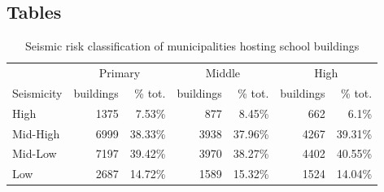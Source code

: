 \documentclass[openany, 11pt, oneside]{book}
\begin{document}
\begin{subappendices} 

 

\section{Tables} \label{Appendix1}
\begin{table}[ht]
\centering

\begin{tabular}{lrrrrrr}
  \hline
   & \multicolumn{2}{c}{Primary}& \multicolumn{2}{c}{Middle}& \multicolumn{2}{c}{High}\\
  Seismicity & buildings & \% tot. & buildings & \% tot. & buildings & \% tot. \\ 
  \hline
  High     & 1375 & 7.53\%  & 877  & 8.45\%  & 662  & 6.1\% \\ 
  Mid-High & 6999 & 38.33\% & 3938 & 37.96\% & 4267 & 39.31\% \\ 
  Mid-Low  & 7197 & 39.42\% & 3970 & 38.27\% & 4402 & 40.55\% \\ 
  Low      & 2687 & 14.72\% & 1589 & 15.32\% & 1524 & 14.04\% \\ 
   \hline
\end{tabular}

\captionsetup{width=0.9\textwidth}
\caption{Seismic risk classification of municipalities hosting school buildings}
\label{tab:seismicity}
\end{table}






\end{subappendices}
\end{document}
